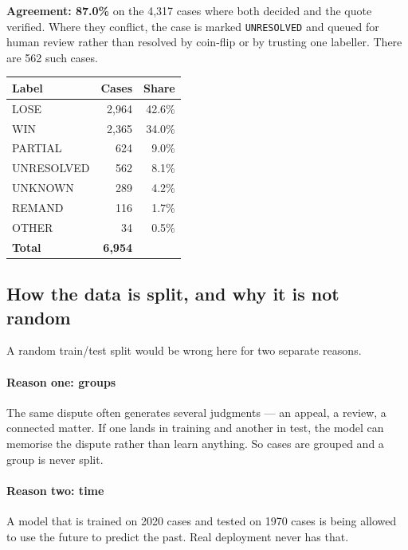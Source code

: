 \documentclass[12pt,a4paper]{article}
\newcommand{\code}[1]{\texttt{\small #1}}
\begin{document}
\textbf{Agreement: 87.0\%} on the 4,317 cases where both decided and the quote verified. Where they
conflict, the case is marked \code{UNRESOLVED} and queued for human review rather than resolved by
coin-flip or by trusting one labeller. There are 562 such cases.

\begin{center}
\begin{tabular}{@{}lrr@{}}
\toprule
\textbf{Label} & \textbf{Cases} & \textbf{Share} \\
\midrule
LOSE        & 2,964 & 42.6\% \\
WIN         & 2,365 & 34.0\% \\
PARTIAL     &   624 &  9.0\% \\
UNRESOLVED  &   562 &  8.1\% \\
UNKNOWN     &   289 &  4.2\% \\
REMAND      &   116 &  1.7\% \\
OTHER       &    34 &  0.5\% \\
\midrule
\textbf{Total} & \textbf{6,954} & \\
\bottomrule
\end{tabular}
\end{center}

\subsection{How the data is split, and why it is not random}

A random train/test split would be wrong here for two separate reasons.

\paragraph{Reason one: groups} The same dispute often generates several judgments --- an appeal,
a review, a connected matter. If one lands in training and another in test, the model can memorise
the dispute rather than learn anything. So cases are grouped and a group is never split.

\paragraph{Reason two: time} A model that is trained on 2020 cases and tested on 1970 cases is
being allowed to use the future to predict the past. Real deployment never has that.
\end{document}
